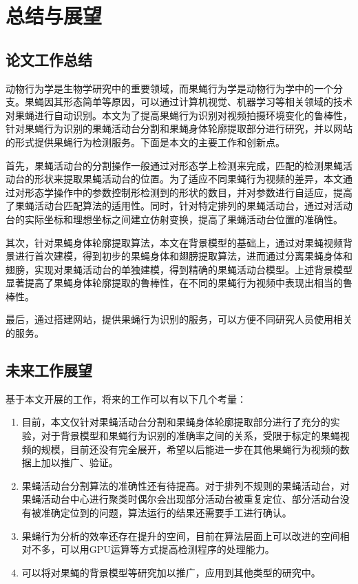 \chapter{总结与展望}

\section{论文工作总结}

动物行为学是生物学研究中的重要领域，而果蝇行为学是动物行为学中的一个分支。果蝇因其形态简单等原因，可以通过计算机视觉、机器学习等相关领域的技术对果蝇进行自动识别。本文为了提高果蝇行为识别对视频拍摄环境变化的鲁棒性，针对果蝇行为识别的果蝇活动台分割和果蝇身体轮廓提取部分进行研究，并以网站的形式提供果蝇行为检测服务。下面是本文的主要工作和创新点。

首先，果蝇活动台的分割操作一般通过对形态学上检测来完成，匹配的检测果蝇活动台的形状来提取果蝇活动台的位置。为了适应不同果蝇行为视频的差异，本文通过对形态学操作中的参数控制形检测到的形状的数目，并对参数进行自适应，提高了果蝇活动台匹配算法的适用性。同时，针对特定排列的果蝇活动台，通过对活动台的实际坐标和理想坐标之间建立仿射变换，提高了果蝇活动台位置的准确性。

其次，针对果蝇身体轮廓提取算法，本文在背景模型的基础上，通过对果蝇视频背景进行首次建模，得到初步的果蝇身体和翅膀提取算法，进而通过分离果蝇身体和翅膀，实现对果蝇活动台的单独建模，得到精确的果蝇活动台模型。上述背景模型显著提高了果蝇身体轮廓提取的鲁棒性，在不同的果蝇行为视频中表现出相当的鲁棒性。

最后，通过搭建网站，提供果蝇行为识别的服务，可以方便不同研究人员使用相关的服务。

\section{未来工作展望}

基于本文开展的工作，将来的工作可以有以下几个考量：

\begin{enumerate}
\item 目前，本文仅针对果蝇活动台分割和果蝇身体轮廓提取部分进行了充分的实验，对于背景模型和果蝇行为识别的准确率之间的关系，受限于标定的果蝇视频的规模，目前还没有完全展开，希望以后能进一步在其他果蝇行为视频的数据上加以推广、验证。
\item 果蝇活动台分割算法的准确性还有待提高。对于排列不规则的果蝇活动台，对果蝇活动台中心进行聚类时偶尔会出现部分活动台被重复定位、部分活动台没有被准确定位到的问题，算法运行的结果还需要手工进行确认。
\item 果蝇行为分析的效率还存在提升的空间，目前在算法层面上可以改进的空间相对不多，可以用GPU运算等方式提高检测程序的处理能力。
\item 可以将对果蝇的背景模型等研究加以推广，应用到其他类型的研究中。
\end{enumerate}
